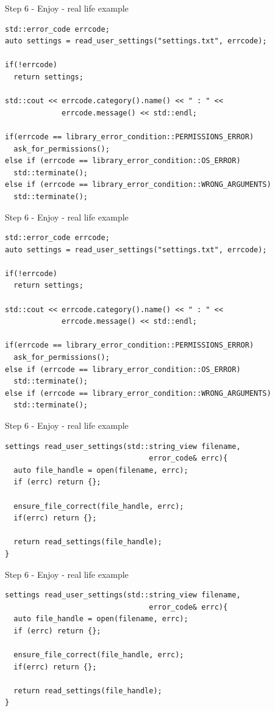\documentclass[10pt]{beamer}
\begin{document}
\begin{frame}[fragile]{Step 6 - Enjoy - real life example}
	\begin{verbatim}
std::error_code errcode;
auto settings = read_user_settings("settings.txt", errcode);

if(!errcode)
  return settings;

std::cout << errcode.category().name() << " : " <<
             errcode.message() << std::endl;

if(errcode == library_error_condition::PERMISSIONS_ERROR)
  ask_for_permissions();
else if (errcode == library_error_condition::OS_ERROR)
  std::terminate();
else if (errcode == library_error_condition::WRONG_ARGUMENTS)
  std::terminate();
	\end{verbatim}
\end{frame}

\begin{frame}[fragile]{Step 6 - Enjoy - real life example}
	\begin{verbatim}
std::error_code errcode;
auto settings = read_user_settings("settings.txt", errcode);

if(!errcode)
  return settings;

std::cout << errcode.category().name() << " : " <<
             errcode.message() << std::endl;

if(errcode == library_error_condition::PERMISSIONS_ERROR)
  ask_for_permissions();
else if (errcode == library_error_condition::OS_ERROR)
  std::terminate();
else if (errcode == library_error_condition::WRONG_ARGUMENTS)
  std::terminate();
	\end{verbatim}
\end{frame}

\begin{frame}[fragile]{Step 6 - Enjoy - real life example}
	\begin{verbatim}
settings read_user_settings(std::string_view filename,
	                             error_code& errc){
  auto file_handle = open(filename, errc);
  if (errc) return {};

  ensure_file_correct(file_handle, errc);
  if(errc) return {};

  return read_settings(file_handle);
}
	\end{verbatim}
\end{frame}

\begin{frame}[fragile]{Step 6 - Enjoy - real life example}
	\begin{verbatim}
settings read_user_settings(std::string_view filename,
	                             error_code& errc){
  auto file_handle = open(filename, errc);
  if (errc) return {};

  ensure_file_correct(file_handle, errc);
  if(errc) return {};

  return read_settings(file_handle);
}
	\end{verbatim}
\end{frame}
\end{document}
